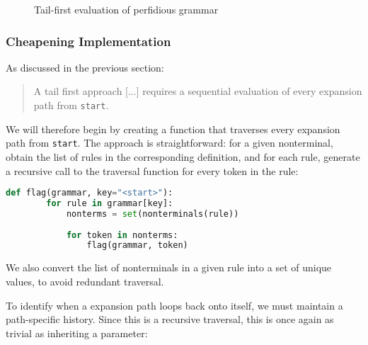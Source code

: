 \documentclass[8pt, twoside]{extarticle}
\begin{document}
\begin{figure}[hbt!]

	\caption{Tail-first evaluation of perfidious grammar}
	\label{fig:tlfstevalex}
\end{figure}

\subsubsection{Cheapening Implementation}

As discussed in the previous section:

\begin{quotation}
	\noindent A tail first approach [...] requires a sequential evaluation of every expansion path from \verb|start|.
\end{quotation}

We will therefore begin by creating a function that traverses every expansion path from \verb|start|. The approach is straightforward: for a given nonterminal, obtain the list of rules in the corresponding definition, and for each rule, generate a recursive call to the traversal function for every token in the rule:

\begin{lstlisting}[gobble=2, language=Python, caption={Grammar traversal}] 
	def flag(grammar, key="<start>"):
		for rule in grammar[key]:
			nonterms = set(nonterminals(rule))
				
			for token in nonterms:
				flag(grammar, token)
\end{lstlisting}

We also convert the list of nonterminals in a given rule into a set of unique values, to avoid redundant traversal. 

To identify when a expansion path loops back onto itself, we must maintain a path-specific history. Since this is a recursive traversal, this is once again as trivial as inheriting a parameter:
\end{document}

